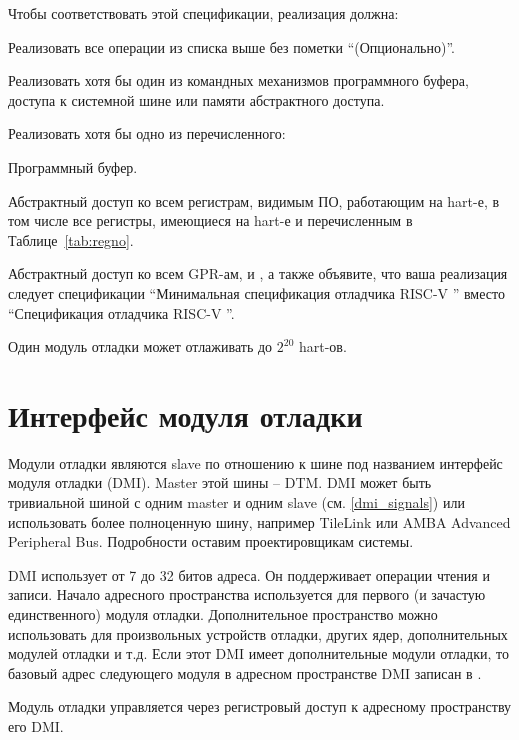 \begin{steps}{Чтобы соответствовать этой спецификации,
    реализация должна:}
\item Реализовать все операции из списка выше без пометки ``(Опционально)''.
\item Реализовать хотя бы один из командных механизмов программного буфера, доступа к системной шине или памяти
    абстрактного доступа.
\item
    \begin{steps}{Реализовать хотя бы одно из перечисленного:}
        \item Программный буфер.
        \item Абстрактный доступ ко всем регистрам, видимым
            ПО, работающим на hart-е, в том числе все регистры, имеющиеся
            на hart-е и перечисленным в Таблице~\ref{tab:regno}.
        \item Абстрактный доступ ко всем GPR-ам, \RcsrDcsr и
            \RcsrDpc, а также объявите, что ваша реализация следует спецификации
            ``Минимальная спецификация отладчика RISC-V \versionnum'' вместо
            ``Спецификация отладчика RISC-V \versionnum''.
    \end{steps}
\end{steps}

Один модуль отладки может отлаживать до $2^{20}$ hart-ов.

\section{Интерфейс модуля отладки} \label{dmi}

Модули отладки являются slave по отношению к шине под названием интерфейс модуля отладки (DMI). Master
этой шины -- DTM.
DMI может быть тривиальной шиной с одним master и одним slave (см. \ref{dmi_signals})
или использовать более полноценную шину, например TileLink или AMBA Advanced Peripheral
Bus. Подробности оставим проектировщикам системы.

DMI использует от 7 до 32 битов адреса.  Он поддерживает операции чтения и записи.
Начало адресного пространства используется для первого (и зачастую единственного)
модуля отладки. Дополнительное пространство можно использовать для произвольных
устройств отладки, других ядер, дополнительных модулей отладки и т.д.
Если этот DMI имеет дополнительные модули отладки, то базовый адрес следующего
модуля в адресном пространстве DMI записан в \RdmNextdm.

Модуль отладки управляется через регистровый доступ к адресному пространству его DMI.

